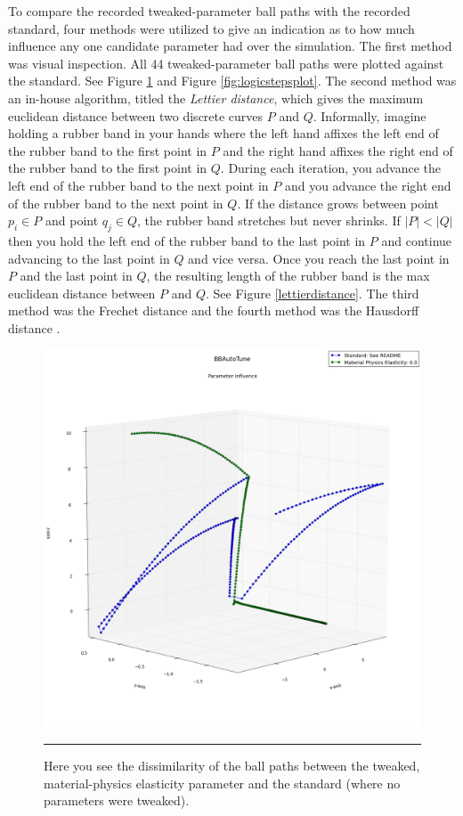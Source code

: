 To compare the recorded tweaked-parameter ball paths with the recorded standard, four methods were utilized to give an indication as to how much influence any one candidate parameter had over the simulation. The first method was visual inspection. All 44 tweaked-parameter ball paths were plotted against the standard. See Figure \ref{fig:matphysplot} and Figure \ref{fig:logicstepsplot}. The second method was an in-house algorithm, titled the \textit{Lettier distance}, which gives the maximum euclidean distance between two discrete curves $P$ and $Q$. Informally, imagine holding a rubber band in your hands where the left hand affixes the left end of the rubber band to the first point in $P$ and the right hand affixes the right end of the rubber band to the first point in $Q$. During each iteration, you advance the left end of the rubber band to the next point in $P$ and you advance the right end of the rubber band to the next point in $Q$. If the distance grows between point $p_i\in P$ and point $q_j \in Q$, the rubber band stretches but never shrinks. If $|P|<|Q|$ then you hold the left end of the rubber band to the last point in $P$ and continue advancing to the last point in $Q$ and vice versa. Once you reach the last point in $P$ and the last point in $Q$, the resulting length of the rubber band is the max euclidean distance between $P$ and $Q$. See Figure \ref{lettierdistance}. The third method was the Frechet distance and the fourth method was the Hausdorff distance \cite{frechet} \cite{hausdorff}.

\begin{figure}[htbp]
\centering
\includegraphics[scale=0.35]{../Figures/Chapter4/material_physics_ball_plot.png}
\rule{35em}{0.5pt}
\caption[Physics Engine Racquetball Path Dissimilarity]{Here you see the dissimilarity of the ball paths between the tweaked, material-physics elasticity parameter and the standard (where no parameters were tweaked).}
\label{fig:matphysplot}
\end{figure}

